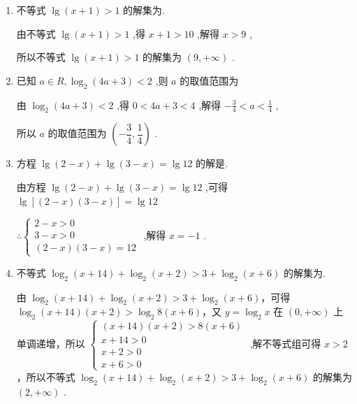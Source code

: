 \begin{enumerate}
    \item 不等式 $\lg \left( {x + 1}\right)  > 1$ 的解集为.
    \begin{jieda}
        由不等式 $\lg \left( {x + 1}\right)  > 1$ ,得 $x + 1 > {10}$ ,解得 $x > 9$ ,
        
        所以不等式 $\lg \left( {x + 1}\right)  > 1$ 的解集为 $\left( {9, + \infty }\right)$ .
    \end{jieda} 
    \item 已知 $a \in  R,{\log }_{2}\left( {{4a} + 3}\right)  < 2$ ,则 $a$ 的取值范围为
    \begin{jieda}
        由 ${\log }_{2}\left( {{4a} + 3}\right)  < 2$ ,得 $0 < {4a} + 3 < 4$ ,解得 $- \frac{3}{4} < a < \frac{1}{4}$ ,
        
        所以 $a$ 的取值范围为 $\left( {-\dfrac{3}{4},\dfrac{1}{4}}\right)$ .
    \end{jieda}
    
    \item 方程 $\lg \left( {2 - x}\right)  + \lg \left( {3 - x}\right)  = \lg {12}$ 的解是.
    \begin{jieda}
        由方程 $\lg \left( {2 - x}\right)  + \lg \left( {3 - x}\right)  = \lg {12}$ ,可得 $\lg \left\lbrack  {\left( {2 - x}\right) \left( {3 - x}\right) }\right\rbrack   = \lg {12}$
        
        $\therefore \left\{  \begin{array}{l} 2 - x > 0 \\  3 - x > 0 \\  \left( {2 - x}\right) \left( {3 - x}\right)  = {12} \end{array}\right.$ ,解得 $x =  - 1$ .
    \end{jieda}
    \item 不等式 ${\log }_{2}\left( {x + {14}}\right)  + {\log }_{2}\left( {x + 2}\right)  > 3 + {\log }_{2}\left( {x + 6}\right)$ 的解集为.
    \begin{jieda}
        由 ${\log }_{2}\left( {x + {14}}\right)  + {\log }_{2}\left( {x + 2}\right)  > 3 + {\log }_{2}\left( {x + 6}\right)$，可得 ${\log }_{2}\left( {x + {14}}\right) \left( {x + 2}\right)  > {\log }_{2}8\left( {x + 6}\right)$，又 $y = {\log }_{2}x$ 在 $\left( {0, + \infty }\right)$ 上单调递增，所以 $\left\{  \begin{array}{l} \left( {x + {14}}\right) \left( {x + 2}\right)  > 8\left( {x + 6}\right) \\  x + {14} > 0 \\  x + 2 > 0 \\  x + 6 > 0 \end{array}\right.$ ,解不等式组可得 $x > 2$，所以不等式 ${\log }_{2}\left( {x + {14}}\right)  + {\log }_{2}\left( {x + 2}\right)  > 3 + {\log }_{2}\left( {x + 6}\right)$ 的解集为 $\left( {2, + \infty }\right)$ .
    \end{jieda}
\end{enumerate}
